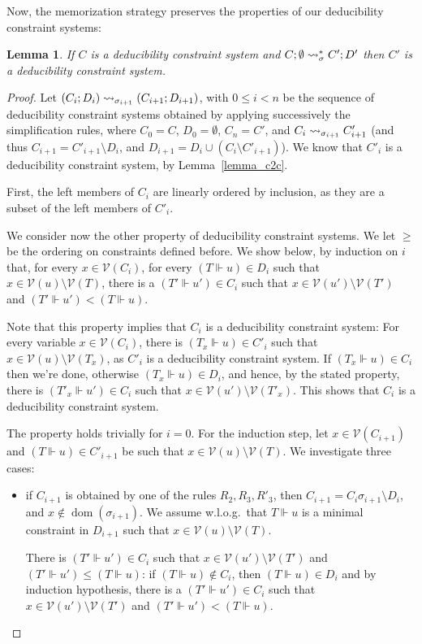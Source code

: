 \documentclass[acmtocl,acmnow]{acmtrans2m}
\newtheorem{lemma}[theorem]{Lemma}
\newcommand{\var}{\mathcal{V}}
\newcommand{\dom}{\operatorname{dom}}
\newcommand{\dedsys}[1]{deducibility constraint system}
\newcommand{\dedsyss}[1]{deducibility constraint systems}
\begin{document}
Now, the memorization strategy preserves the properties of our \dedsyss{}:
\begin{lemma}\label{lemma:preserves_origination}
If $C$ is a \dedsys{} and
$C;\emptyset\rightsquigarrow^*_{\sigma} C';D'$ then $C'$ is a \dedsys{}.
\end{lemma}
\begin{proof}
Let $(C_i;D_i)\rightsquigarrow_{\sigma_{i+1}}(C_{i+1};D_{i+1})$, with $0\le i< n$ be the sequence of
\dedsyss{} obtained by applying
successively the simplification rules, where $C_0=C$,
$D_0=\emptyset$, $C_n=C'$, and
$C_i\rightsquigarrow_{\sigma_{i+1}} C'_{i+1}$ (and thus $C_{i+1}=C'_{i+1}\setminus D_i$, and $D_{i+1}=D_i\cup (C_i\setminus C'_{i+1})$).
We know that $C'_i$ is a \dedsys{}, by Lemma~\ref{lemma_c2c}. 

First, the left members of $C_i$ are linearly ordered by inclusion, as
they are a subset of the left members of $C'_i$. 

We consider now the other property of \dedsyss{}.
We let $\geq$ be the ordering on constraints defined before. 
We show below, by induction on $i$ that, for every $x\in \var(C_i)$,
for every $(T\Vdash u)\in D_i$ such that $x\in \var(u)\setminus\var(T)$,
there is a $(T'\Vdash u') \in C_i$ such that $x\in \var(u')\setminus\var(T')$
and $(T'\Vdash u') < (T\Vdash u)$. 

Note that this property implies that $C_i$ is a \dedsys{}: For every
variable $x\in \var(C_i)$, there is $(T_x\Vdash u)\in C'_i$ such that
$x\in \var(u)\setminus \var(T_x)$, as $C'_i$ is a \dedsys{}.  If
$(T_x\Vdash u)\in C_i$ then we're done, otherwise $(T_x\Vdash u)\in
D_i$, and hence, by the stated property, there is $(T'_x\Vdash u')\in
C_i$ such that $x\in \var(u')\setminus \var(T'_x)$. This shows that
$C_i$ is a \dedsys{}.

The property holds trivially for $i=0$. For the induction step,
let  $x\in\var(C_{i+1})$ and  $(T\Vdash u)\in C'_{i+1}$ be such that $x\in\var(u)\setminus \var(T)$.
We investigate three cases:
\begin{itemize}
\item if $C_{i+1}$ is obtained by one of the rules $R_2,R_3,R'_3$, then $C_{i+1}= C_i\sigma_{i+1}\setminus D_i$,
and $x\notin \dom(\sigma_{i+1})$.
We assume w.l.o.g.~that $T\Vdash u$ is a minimal constraint in $D_{i+1}$ such
that $x\in \var(u)\setminus \var(T)$. 

There is $(T'\Vdash u') \in C_i$ such that $x\in \var(u')\setminus \var(T')$ and $(T'\Vdash u') \leq (T\Vdash u)$:
if $(T\Vdash u)\notin C_i$, then $(T\Vdash u) \in D_i$ and
by induction hypothesis, there is a $(T'\Vdash u')\in C_i$ such that 
$x\in \var(u')\setminus \var(T')$ and $(T'\Vdash u') < (T\Vdash u)$.


\end{itemize}
\end{proof}
\end{document}
